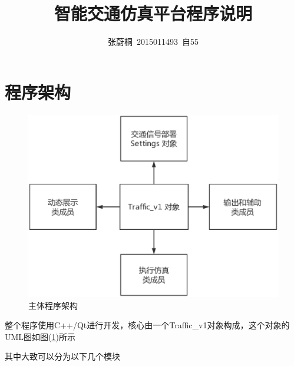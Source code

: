 \documentclass[UTF8,a4paper]{ctexart}
\title{智能交通仿真平台程序说明}
\author{张蔚桐\ 2015011493\ 自55}
\begin{document}
\maketitle
\clearpage
\section{程序架构}
\begin{figure}
\centering
\includegraphics[width=\textwidth]{ClassDiagram.eps}
\caption{主体程序架构}
\label{Trafficv1}
\end{figure}
整个程序使用C++/Qt进行开发，核心由一个Traffic\_v1对象构成，这个对象的UML图如图(\ref{Trafficv1})所示

其中大致可以分为以下几个模块
\clearpage
\end{document}
